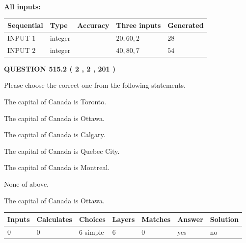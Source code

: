 \documentclass[12pt]{article}
\begin{document}
   
   
   
\noindent\vspace{0.1in}\hspace{-0.08in} {\textbf{\Large{All inputs: }}}
   
   
  
  
\noindent\begin{tabular}{|l|l|l|l|l|}
\hline
 Sequential & Type & Accuracy & Three inputs & Generated \\ 
\hline
 
 
  INPUT $  1 $ & integer &  & $
 20
 , 
 60
 , 
 2
 $ & $ 28 $ 
 \\  \hline  
 
 
  INPUT $  2 $ & integer &  & $
 40
 , 
 80
 , 
 7
 $ & $ 54 $ 
 \\  \hline  
 \end{tabular}
   
   
  
\vspace{0.2in}
  
{\textbf{\Large{QUESTION
515.2 
 ( 2 , 2 , 201 )
}}}
  
  
Please choose the correct one from the following statements.
 
 
The capital of Canada is Toronto.
 
 
The capital of Canada is Ottawa.
 
 
The capital of Canada is Calgary.
 
 
The capital of Canada is Quebec City.
 
 
The capital of Canada is Montreal.
 
 
 None of above.
 
 
\noindent{}
 
 
The capital of Canada is Ottawa.
 
 
\noindent{}
 
 
   
   
   
   
\noindent\begin{tabular}{|l|l|l|l|l|l|l|}
 \hline
Inputs & Calculates & Choices & Layers & Matches & Answer & Solution \\ \hline
 0  & 
 0  & 
 6
  simple  
  & 
 6  & 
 0  & 
  yes & 
  no 
  \\ \hline
 \end{tabular}
   
\end{document}
